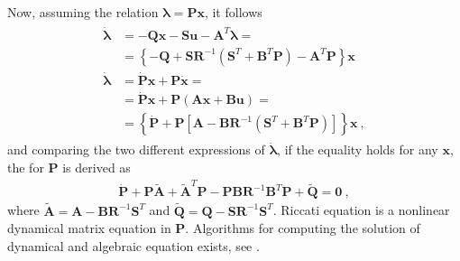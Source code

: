 \documentclass[letterpaper,10pt,english]{jupyterBook}
\begin{document}
\sphinxAtStartPar
Now, assuming the relation \(\boldsymbol{\lambda} = \mathbf{P} \mathbf{x}\), it follows
\begin{equation*}
\begin{split}\begin{aligned}
  \dot{\boldsymbol{\lambda}} 
  & = - \mathbf{Q} \mathbf{x} - \mathbf{S} \mathbf{u} - \mathbf{A}^T \boldsymbol{\lambda} = \\
  & = \left\{ - \mathbf{Q}+ \mathbf{S} \mathbf{R}^{-1} \left( \mathbf{S}^T + \mathbf{B}^T \mathbf{P} \right) - \mathbf{A}^T \mathbf{P} \right\} \mathbf{x}  \\
  \dot{\boldsymbol{\lambda}}
  & = \dot{\mathbf{P}} \mathbf{x} + \mathbf{P} \dot{\mathbf{x}} = \\
  & = \dot{\mathbf{P}} \mathbf{x} + \mathbf{P} \left( \mathbf{A} \mathbf{x} + \mathbf{B} \mathbf{u} \right) = \\
  & = \left\{ \dot{\mathbf{P}} + \mathbf{P} \left[ \mathbf{A} - \mathbf{B} \mathbf{R}^{-1} \left( \mathbf{S}^T + \mathbf{B}^T \mathbf{P} \right)  \right] \right\} \mathbf{x} \ ,
\end{aligned}\end{split}
\end{equation*}
\sphinxAtStartPar
and comparing the two different expressions of \(\dot{\boldsymbol{\lambda}}\), if the equality holds for any \(\mathbf{x}\), the  for \(\mathbf{P}\) is derived as
\begin{equation*}
\begin{split}\dot{\mathbf{P}} + \mathbf{P} \widetilde{\mathbf{A}} + \widetilde{\mathbf{A}}^T \mathbf{P} - \mathbf{P} \mathbf{B} \mathbf{R}^{-1} \mathbf{B}^T \mathbf{P} + \widetilde{\mathbf{Q}} = \mathbf{0} \ ,\end{split}
\end{equation*}
\sphinxAtStartPar
where \(\widetilde{\mathbf{A}} = \mathbf{A} - \mathbf{B} \mathbf{R}^{-1} \mathbf{S}^T \) and \(\widetilde{\mathbf{Q}} = \mathbf{Q} - \mathbf{S} \mathbf{R}^{-1} \mathbf{S}^T\). Riccati equation is a non\sphinxhyphen{}linear dynamical matrix equation in \(\mathbf{P}\). Algorithms for computing the solution of dynamical and algebraic equation exists, see {\hyperref[\detokenize{ch/control/optimal-control-full-state-old:control-optimal-riccati}]{}}.
\end{document}
